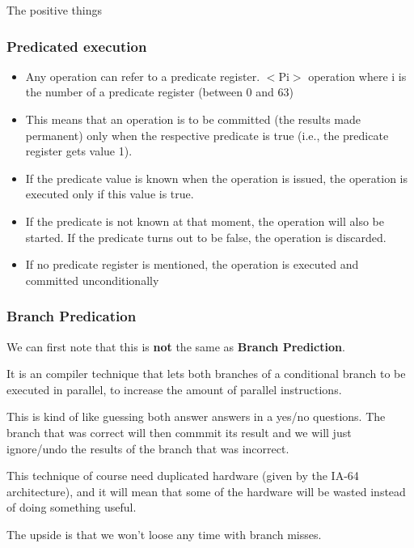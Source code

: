 The positive things 

\subsubsection{Predicated execution}
\begin{itemize}
\item Any operation can refer to a predicate register. $<$Pi$>$ operation where i is the number of a predicate register (between 0 and 63)
\item This means that an operation is to be committed (the results made permanent) only when the respective predicate is true (i.e., the predicate register gets value 1).
\item If the predicate value is known when the operation is issued, the operation is executed only if this value is true.
\item If the predicate is not known at that moment, the operation will also be started. If the predicate turns out to be false, the operation is discarded.
\item If no predicate register is mentioned, the operation is executed and committed unconditionally
\end{itemize}


\subsubsection{Branch Predication}
We can first note that this is \textbf{not} the same as \textbf{Branch Prediction}.

It is an compiler technique that lets both branches of a conditional branch to be executed in parallel, to increase the amount of parallel instructions.

This is kind of like guessing both answer answers in a yes/no questions. The branch that was correct will then commmit its result and we will just ignore/undo the results of the branch that was incorrect.

This technique of course need duplicated hardware (given by the IA-64 architecture), and it will mean that some of the hardware will be wasted instead of doing something useful.

The upside is that we won't loose any time with branch misses.
